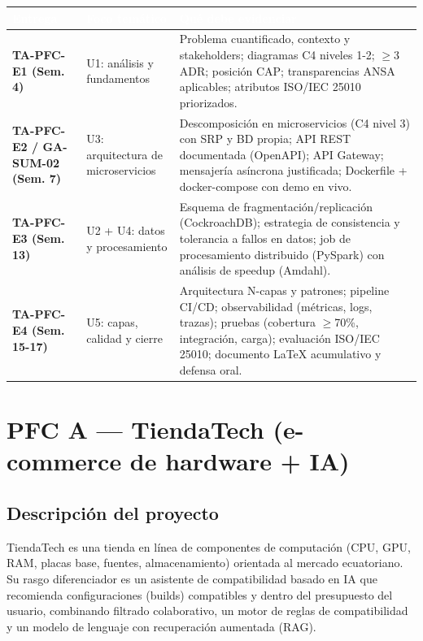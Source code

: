\documentclass[11pt]{article}
\begin{document}
\begin{longtable}{>{\raggedright\arraybackslash}p{3.4cm} >{\raggedright\arraybackslash}p{3.4cm} >{\raggedright\arraybackslash}p{8.5cm}}
\rowcolor{uteqGreen}\textcolor{white}{\textbf{Entrega}} & \textcolor{white}{\textbf{Foco temático}} & \textcolor{white}{\textbf{Qué debe evidenciar}}\\
\endhead
\cellcolor{uteqLight}\textbf{TA-PFC-E1 (Sem. 4)} & U1: análisis y fundamentos & Problema cuantificado, contexto y stakeholders; diagramas C4 niveles 1-2; $\geq$3 ADR; posición CAP; transparencias ANSA aplicables; atributos ISO/IEC 25010 priorizados.\\
\cellcolor{uteqLight}\textbf{TA-PFC-E2 / GA-SUM-02 (Sem. 7)} & U3: arquitectura de microservicios & Descomposición en microservicios (C4 nivel 3) con SRP y BD propia; API REST documentada (OpenAPI); API Gateway; mensajería asíncrona justificada; Dockerfile + docker-compose con demo en vivo.\\
\cellcolor{uteqLight}\textbf{TA-PFC-E3 (Sem. 13)} & U2 + U4: datos y procesamiento & Esquema de fragmentación/replicación (CockroachDB); estrategia de consistencia y tolerancia a fallos en datos; job de procesamiento distribuido (PySpark) con análisis de speedup (Amdahl).\\
\cellcolor{uteqLight}\textbf{TA-PFC-E4 (Sem. 15-17)} & U5: capas, calidad y cierre & Arquitectura N-capas y patrones; pipeline CI/CD; observabilidad (métricas, logs, trazas); pruebas (cobertura $\geq$70\%, integración, carga); evaluación ISO/IEC 25010; documento LaTeX acumulativo y defensa oral.\\
\end{longtable}

\clearpage

\section{PFC A --- TiendaTech (e-commerce de hardware + IA)}
\subsection{Descripción del proyecto}
TiendaTech es una tienda en línea de componentes de computación (CPU, GPU, RAM, placas base, fuentes, almacenamiento) orientada al mercado ecuatoriano. Su rasgo diferenciador es un asistente de compatibilidad basado en IA que recomienda configuraciones (builds) compatibles y dentro del presupuesto del usuario, combinando filtrado colaborativo, un motor de reglas de compatibilidad y un modelo de lenguaje con recuperación aumentada (RAG).
\end{document}
